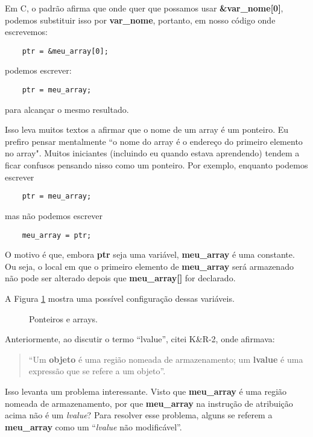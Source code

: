 Em C, o padrão afirma que onde quer que possamos usar \textbf{\&var\_nome[0]}, podemos substituir isso por \textbf{var\_nome}, portanto, em nosso código onde escrevemos:
\begin{lstlisting}
	ptr = &meu_array[0];
\end{lstlisting}
podemos escrever:
\begin{lstlisting}
	ptr = meu_array;
\end{lstlisting}
para alcançar o mesmo resultado.

Isso leva muitos textos a afirmar que o nome de um array é um ponteiro. Eu prefiro pensar mentalmente ``o nome do array é o endereço do primeiro elemento no array". Muitos iniciantes (incluindo eu quando estava aprendendo) tendem a ficar confusos pensando nisso como um ponteiro. Por exemplo, enquanto podemos escrever
\begin{lstlisting}
	ptr = meu_array;
\end{lstlisting}
mas não podemos escrever
\begin{lstlisting}
	meu_array = ptr;
\end{lstlisting}

O motivo é que, embora \textbf{ptr} seja uma variável, \textbf{meu\_array} é uma constante. Ou seja, o local em que o primeiro elemento de \textbf{meu\_array} será armazenado não pode ser alterado depois que \textbf{meu\_array[]} for declarado.

A Figura \ref{fig:pontarrays} mostra uma possível configuração dessas variáveis.
\begin{figure}[ht]
	\begin{center}
		
		\caption{Ponteiros e arrays.}
		\label{fig:pontarrays}
	\end{center}
\end{figure}

Anteriormente, ao discutir o termo ``lvalue'', citei K\&R-2, onde afirmava:

\begin{quotation}
	``Um \textbf{objeto} é uma região nomeada de armazenamento; um \textbf{lvalue} é uma expressão que se refere a um objeto''.
\end{quotation}

Isso levanta um problema interessante. Visto que \textbf{meu\_array} é uma região nomeada de armazenamento, por que \textbf{meu\_array} na instrução de atribuição acima não é um \textit{lvalue}? Para resolver esse problema, alguns se referem a \textbf{meu\_array} como um ``\textit{lvalue} não modificável''.

